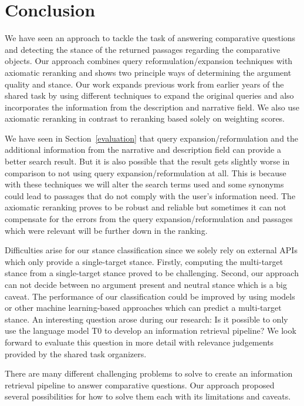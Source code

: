 \section{Conclusion}

We have seen an approach to tackle the task of answering comparative questions and detecting the stance of the returned passages regarding the comparative objects.
Our approach combines query reformulation/expansion techniques with axiomatic reranking and shows two principle ways of determining the argument quality and stance.
Our work expands previous work from earlier years of the shared task by using different techniques to expand the original queries and also incorporates the information from the description and narrative field.
We also use axiomatic reranking in contrast to reranking based solely on weighting scores.

We have seen in Section~\ref{evaluation} that query expansion/reformulation and the additional information from the narrative and description field can provide a better search result.
But it is also possible that the result gets slightly worse in comparison to not using query expansion/reformulation at all.
This is because with these techniques we will alter the search terms used and some synonyms could lead to passages that do not comply with the user's information need.
The axiomatic reranking proves to be robust and reliable but sometimes it can not compensate for the errors from the query expansion/reformulation and passages which were relevant will be further down in the ranking.

Difficulties arise for our stance classification since we solely rely on external APIs which only provide a single-target stance.
Firstly, computing the multi-target stance from a single-target stance proved to be challenging.
Second, our approach can not decide between no argument present and neutral stance which is a big caveat.
The performance of our classification could be improved by using \Bert models or other machine learning-based approaches which can predict a multi-target stance.
An interesting question arose during our research:
Is it possible to only use the language model T0 to develop an information retrieval pipeline?
We look forward to evaluate this question in more detail with relevance judgements provided by the shared task organizers.

There are many different challenging problems to solve to create an information retrieval pipeline to answer comparative questions.
Our approach proposed several possibilities for how to solve them each with its limitations and caveats.
